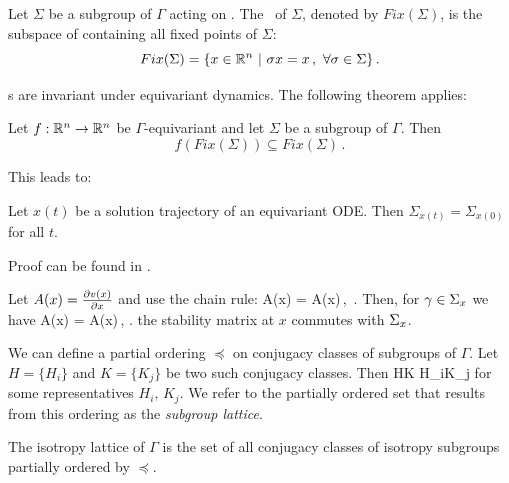 \begin{definition}
 \label{def:fixedsp}
  Let $\Sigma$ be a subgroup of $\Gamma$ acting on . The \fixedsp\ of $\Sigma$,
 denoted by $Fix(\Sigma)$, is the subspace of  containing all fixed points of $\Sigma$:
\[
	Fix(\Sigma)=\{x\in\mathbb{R}^{n}\ |\ \sigma x = x\,,\ \forall \sigma\in\Sigma\}\,.
\]
\end{definition}

\Fixedsp s are invariant under equivariant dynamics. The following theorem applies:

\begin{theorem}
 Let $f:\mathbb{R}^{n}\rightarrow\mathbb{R}^{n}$ be $\Gamma$-equivariant and let $\Sigma$ be a subgroup of $\Gamma$. Then
\[
 f\left(Fix(\Sigma)\right)\subseteq Fix(\Sigma)\,.
\]
\end{theorem}

This leads to:
\begin{proposition}
 Let $x(t)$ be a solution trajectory of an equivariant ODE. Then $\Sigma_{x(t)}=\Sigma_{x(0)}$ for all $t$.
\label{pro:gfInv}
\end{proposition}
Proof can be found in .

Let $A(x)=\frac{\partial v(x)}{\partial x}$ and use the chain rule:
\beq
	A(\gamma x) \gamma = \gamma A(x)\,, \qquad \gamma\in\Gamma\,.
	\label{eq:LrzGroupOrb}
\eeq
Then, for $\gamma\in\Sigma_{x}$ we have
\beq
	A(x) \gamma = \gamma A(x)\,, \qquad \gamma\in{}.
	\label{eq:LrzCommut}
\eeq
\ie the stability matrix at $x$ commutes with $\Sigma_{x}$.

We can define a partial ordering $\preceq$ on conjugacy classes of subgroups of $\Gamma$. Let $H=\{H_i\}$ and $K=\{K_j\}$
be two such conjugacy classes. Then
\beq
	H\preceq K \Leftrightarrow H_i\subseteq K_j
	\label{eq:Gorder}
\eeq
for some representatives $H_i,\,K_j$. We refer to the partially ordered set that results from this ordering as the \emph{subgroup lattice}.

\begin{definition}
 The isotropy lattice of $\Gamma$ is the set of all conjugacy classes of isotropy subgroups
 partially ordered by $\preceq$.
\end{definition}

